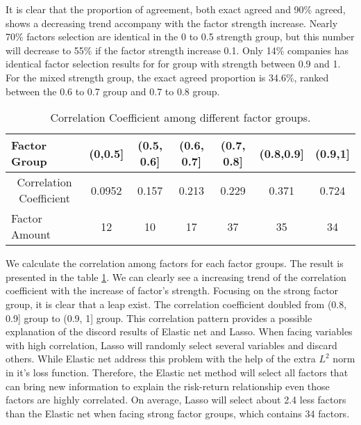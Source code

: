 It is clear that the proportion of agreement, both exact agreed and 90\% agreed, shows a decreasing trend accompany with the factor strength increase.
Nearly 70\% factors selection are identical in the 0 to 0.5 strength group, but this number will decrease to 55\% if the factor strength increase 0.1.
Only 14\% companies has identical factor selection results for for group with strength between 0.9 and 1.
For the mixed strength group, the exact agreed proportion is 34.6\%, ranked between the 0.6 to 0.7 group and 0.7 to 0.8 group.

\begin{table}[h]
	\centering
	\caption{Correlation Coefficient among different factor groups. }
	\label{table:Correlation}
	\begin{tabular}{l|cccccc}
		\hline
		\hline
		Factor Group                                 & (0,0.5{]} & (0.5, 0.6{]} & (0.6, 0.7{]} & (0.7, 0.8{]} & (0.8,0.9{]} & (0.9,1{]} \\ \hline
		\multicolumn{1}{c|}{Correlation Coefficient} & 0.0952    & 0.157        & 0.213        & 0.229        & 0.371       & 0.724   \\
		Factor Amount &12 & 10 &  17 & 37& 35 &34  \\ \hline \hline
	\end{tabular}
\end{table}

We calculate the correlation among factors for each factor groups.
The result is presented in the table \ref{table:Correlation}.
We can clearly see a increasing trend of the correlation coefficient with the increase of factor's strength.
Focusing on the strong factor group, it is clear that a leap exist.
The correlation coefficient doubled from (0.8, 0.9] group to (0.9, 1] group.
This correlation pattern provides a possible explanation of the discord results of Elastic net and Lasso.
When facing variables with high correlation, Lasso will randomly select several variables and discard others.
While Elastic net address this problem with the help of the extra $L^2$ norm in it's loss function.
Therefore, the Elastic net method will select all factors that can bring new information to explain the risk-return relationship even those factors are highly correlated.
On average, Lasso will select about 2.4 less factors than the Elastic net when facing strong factor groups, which contains 34 factors.



